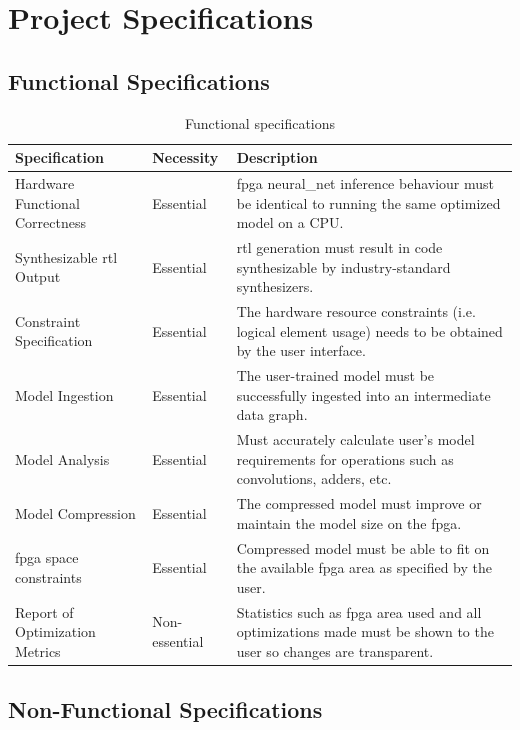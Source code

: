 \documentclass{uw-ece-wkrpt}
\begin{document}
\section{Project Specifications}

\subsection{Functional Specifications}

\begin{table}[H]
\centering
\caption{Functional specifications}\label{tab:func_specs}
\begin{tabularx}{\textwidth}{llX}
\toprule
Specification & Necessity & Description \\
\midrule
Hardware Functional Correctness & Essential & \gls{fpga} \gls{neural_net} inference behaviour must be identical to running the same optimized model on a CPU. \\
Synthesizable \gls{rtl} Output & Essential & \gls{rtl} generation must result in code synthesizable by industry-standard synthesizers. \\
Constraint Specification & Essential & The hardware resource constraints (i.e. logical element usage) needs to be obtained by the user interface. \\
Model Ingestion & Essential & The user-trained model must be successfully ingested into an intermediate data graph. \\
Model Analysis & Essential & Must accurately calculate user's model requirements for operations such as convolutions, adders, etc. \\
Model Compression & Essential & The compressed model must improve or maintain the model size on the \gls{fpga}. \\
\gls{fpga} space constraints & Essential & Compressed model must be able to fit on the available \gls{fpga} area as specified by the user. \\
Report of Optimization Metrics & Non-essential & Statistics such as \gls{fpga} area used and all optimizations made must be shown to the user so changes are transparent. \\
\bottomrule
\end{tabularx}
\end{table}

\subsection{Non-Functional Specifications}
\end{document}
